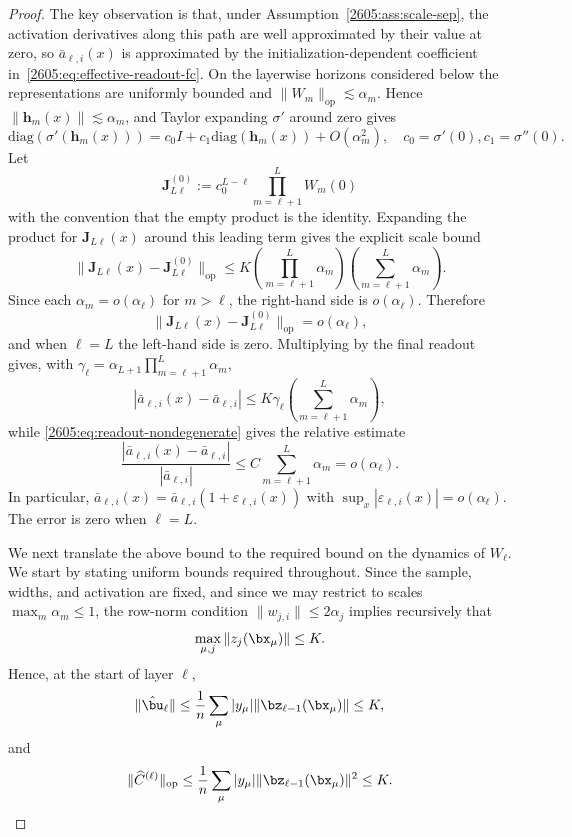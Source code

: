 \begin{proof}
The key observation is that, under Assumption~\ref{2605:ass:scale-sep}, the activation
derivatives along this path are well approximated by their value at zero, so
\(\bar a_{\ell,i}(x)\) is approximated by the initialization-dependent
coefficient in~\eqref{2605:eq:effective-readout-fc}. On the layerwise horizons
considered below the representations are uniformly bounded and
\(\|W_m\|_{\mathrm{op}}\lesssim \alpha_m\). Hence
\(\|\bm h_m(x)\|\lesssim\alpha_m\), and Taylor expanding \(\sigma'\) around
zero gives
\begin{equation}\label{2605:eq:diag-expand}
\mathrm{diag}(\sigma'(\bm{h}_m(x))) = c_0 I + c_1 \mathrm{diag}(\bm{h}_m(x)) + O(\alpha_m^2),
\quad c_0=\sigma'(0), c_1=\sigma''(0).
\end{equation}
Let
\[
    \bm J_{L\ell}^{(0)}:=c_0^{L-\ell}\prod_{m=\ell+1}^L W_m(0)
\]
with the convention that the empty product is the identity. Expanding the
product for \(\bm J_{L\ell}(x)\) around this leading term gives the explicit
scale bound
\[
    \|\bm{J}_{L\ell}(x)-\bm J_{L\ell}^{(0)}\|_{\mathrm{op}}
    \le
    K
    \left(\prod_{m=\ell+1}^{L}\alpha_m\right)
    \left(\sum_{m=\ell+1}^{L}\alpha_m\right).
\]
Since each \(\alpha_m=o(\alpha_\ell)\) for \(m>\ell\), the right-hand side is
\(o(\alpha_\ell)\). Therefore
\begin{equation}\label{2605:eq:Jac-correction}
\|\bm{J}_{L\ell}(x) - \bm{J}_{L\ell}^{(0)}\|_{\mathrm{op}}
= o(\alpha_\ell),
\end{equation}
and when \(\ell=L\) the left-hand side is zero. Multiplying by the final
readout gives, with \(\gamma_\ell=\alpha_{L+1}\prod_{m=\ell+1}^L\alpha_m\),
\[
    |\bar a_{\ell,i}(x)-\bar a_{\ell,i}|
    \le
    K\gamma_\ell
    \left(\sum_{m=\ell+1}^{L}\alpha_m\right),
\]
while \eqref{2605:eq:readout-nondegenerate} gives the relative estimate
\begin{equation}\label{2605:eq:readout-const-approx}
    \frac{|\bar{a}_{\ell,i}(x)-\bar{a}_{\ell,i}|}
    {|\bar a_{\ell,i}|}
    \le
    C
    \sum_{m=\ell+1}^{L}\alpha_m
    =
    o(\alpha_\ell).
\end{equation}
In particular,
\(\bar a_{\ell,i}(x)=\bar a_{\ell,i}(1+\varepsilon_{\ell,i}(x))\) with
\(\sup_x|\varepsilon_{\ell,i}(x)|=o(\alpha_\ell)\). The error is zero when \(\ell=L\).

We next translate the above bound to the required bound on the dynamics of $W_\ell$. We start by stating uniform bounds required throughout.  Since the sample,
widths, and activation are fixed, and since we may restrict to scales
\(\max_m\alpha_m\le1\), the row-norm condition
\(\|w_{j,i}\|\le2\alpha_j\) implies recursively that
\[
    \max_{\mu,j}\|z_j(\bx_\mu)\|\le K .
\]
Hence, at the start of
layer \(\ell\),
\[
\|\hat{\bu}_\ell\|
\le \frac1n\sum_\mu |y_\mu| \|\bz_{\ell-1}(\bx_\mu)\|
\le K,
\]
and
\[
\|\widehat C^{(\ell)}\|_{\mathrm{op}}
\le \frac1n\sum_\mu |y_\mu| \|\bz_{\ell-1}(\bx_\mu)\|^2
\le K .
\]


\end{proof}

